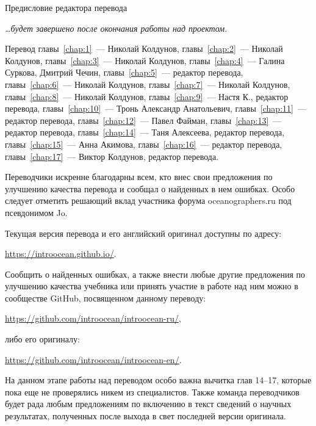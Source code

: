 
\begin{chapter}{Предисловие редактора перевода}

\textit{\dots{}будет завершено после окончания работы над проектом.}

\bigskip 

Перевод главы~\ref{chap:1}~--- Николай Колдунов, 
главы~\ref{chap:2}~--- Николай Колдунов,
главы~\ref{chap:3}~--- Николай Колдунов, 
главы~\ref{chap:4}~--- Галина Суркова, Дмитрий Чечин, 
главы~\ref{chap:5}~--- редактор перевода, 
главы~\ref{chap:6}~--- Николай Колдунов, 
главы~\ref{chap:7}~--- Николай Колдунов,
главы~\ref{chap:8}~--- Николай Колдунов,
главы~\ref{chap:9}~--- Настя К., редактор перевода,
главы~\ref{chap:10}~--- Тронь Александр Анатольевич,
главы~\ref{chap:11}~--- редактор перевода,
главы~\ref{chap:12}~--- Павел Файман,
главы~\ref{chap:13}~--- редактор перевода,
главы~\ref{chap:14}~--- Таня Алексеева, редактор перевода,
главы~\ref{chap:15}~--- Анна Акимова,
главы~\ref{chap:16}~--- редактор перевода,
главы~\ref{chap:17}~--- Виктор Колдунов, редактор перевода.

Переводчики искренне благодарны всем, кто внес свои предложения по
улучшению качества перевода и сообщал о найденных в нем ошибках. Особо
следует отметить решающий вклад участника форума oceanographers.ru под
псевдонимом Jo.

Текущая версия перевода и его английский оригинал доступны по адресу:
\begin{center}
\href{https://introocean.github.io/}%
{\url{https://introocean.github.io/}}.
\end{center}

Сообщить о найденных ошибках, а также внести любые другие предложения
по улучшению качества учебника или принять участие в работе над ним
можно в сообществе GitHub, посвященном данному
переводу:
\begin{center}
\href{https://github.com/introocean/introocean-ru/}%
{\url{https://github.com/introocean/introocean-ru/}},
\end{center}
либо его оригиналу:
\begin{center}
\href{https://github.com/introocean/introocean-en/}%
{\url{https://github.com/introocean/introocean-en/}}.
\end{center}

На данном этапе работы над переводом особо важна вычитка глав 14--17,
которые пока еще не проверялись никем из специалистов. Также команда
переводчиков будет рада любым предложениям по включению в текст
сведений о научных результатах, полученных после выхода в свет
последней версии оригинала.
\end{chapter}

